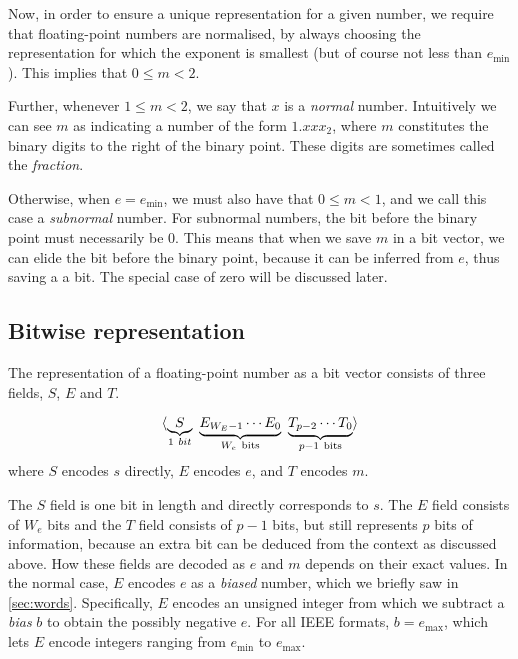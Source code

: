 Now, in order to ensure a unique representation for a given number, we
require that floating-point numbers are normalised, by always choosing
the representation for which the exponent is smallest (but of course
not less than $e_{\text{min}}$).  This implies that $0 \leq m < 2$.

Further, whenever $1 \leq m < 2$, we say that $x$ is a \emph{normal}
number.  Intuitively we can see $m$ as indicating a number of the form
$1.xxx_{2}$, where $m$ constitutes the binary digits to the right of
the binary point.  These digits are sometimes called the
\emph{fraction}.

Otherwise, when $e=e_{\text{min}}$, we must also have that
$0 \leq m < 1$, and we call this case a \emph{subnormal} number.  For
subnormal numbers, the bit before the binary point must necessarily be
0.  This means that when we save $m$ in a bit vector, we can elide the
bit before the binary point, because it can be inferred from $e$, thus
saving a a bit.  The special case of zero will be discussed later.

\subsection{Bitwise representation}

The representation of a floating-point number as a bit vector consists
of three fields, $S$, $E$ and $T$.

\begin{definition}
  \[
    \langle \underbrace{S}_{1~bit}~\underbrace{E_{W_{E}-1}\cdots{E_{0}}}_{W_{e}~\text{bits}}~\underbrace{T_{p-2}\cdots{}T_{0}}_{p-1~\text{bits}} \rangle
  \]
  where $S$ encodes $s$ directly, $E$ encodes $e$, and $T$ encodes
  $m$.
  \label{def:float-fields}
\end{definition}

The $S$ field is one bit in length and directly corresponds to $s$.
The $E$ field consists of $W_{e}$ bits and the $T$ field consists of
$p-1$ bits, but still represents $p$ bits of information, because an
extra bit can be deduced from the context as discussed above. How
these fields are decoded as $e$ and $m$ depends on their exact values.
In the normal case, $E$ encodes $e$ as a \emph{biased} number, which
we briefly saw in \cref{sec:words}.  Specifically, $E$ encodes an
unsigned integer from which we subtract a \emph{bias} $b$ to obtain
the possibly negative $e$.  For all IEEE formats, $b=e_{\text{max}}$,
which lets $E$ encode integers ranging from $e_{\text{min}}$ to
$e_{\text{max}}$.

